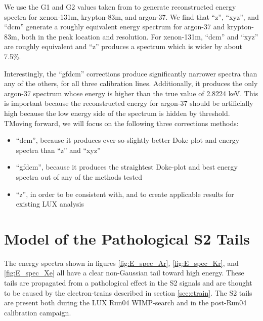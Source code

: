 We use the G1 and G2 values taken from to generate reconstructed energy spectra for xenon-131m, krypton-83m, and argon-37. We find that ``z'', ``xyz'', and ``dcm'' generate a roughly equivalent energy spectrum for argon-37 and krypton-83m, both in the peak location and resolution. For xenon-131m, ``dcm'' and ``xyz'' are roughly equivalent and ``z'' produces a spectrum which is wider by about 7.5\%. 

Interestingly, the ``gfdcm'' corrections produce significantly narrower spectra than any of the others, for all three calibration lines. Additionally, it produces the only argon-37 spectrum whose energy is higher than the true value of 2.8224 keV. This is important because the reconstructed energy for argon-37 should be artificially high because the low energy side of the spectrum is hidden by threshold. TMoving forward, we will focus on the following three corrections methods: 
\begin{itemize}
\item ``dcm'', because it produces ever-so-slightly better Doke plot and energy spectra than ``z'' and ``xyz''
\item ``gfdcm'', because it produces the straightest Doke-plot and best energy spectra out of any of the methods tested
\item ``z'', in order to be consistent with, and to create applicable results for existing LUX analysis
\end{itemize}



\section{Model of the Pathological S2 Tails}\label{sec:s2tails}
The energy spectra shown in figures \ref{fig:E_spec_Ar}, \ref{fig:E_spec_Kr}, and \ref{fig:E_spec_Xe} all have a clear non-Gaussian tail toward high energy. These tails are propagated from a pathological effect in the S2 signals and are thought to be caused by the electron-trains described in section \ref{sec:etrain}. The S2 tails are present both during the LUX Run04 WIMP-search and in the post-Run04 calibration campaign. 

